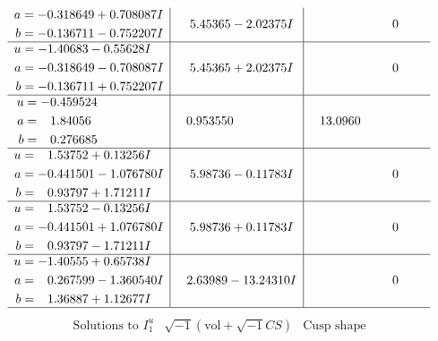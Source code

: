 \documentclass[1p]{elsarticle_modified}
\theoremstyle{definition}
\newcommand{\I}{\sqrt{-1}}
\begin{document}
$$\begin{array}{c|c|c}
\begin{aligned}
a &= -0.318649 + 0.708087 I \\
b &= -0.136711 - 0.752207 I\end{aligned}
 & \phantom{-}5.45365 - 2.02375 I & \phantom{-0.000000 } 0 \\ \hline\begin{aligned}
u &= -1.40683 - 0.55628 I \\
a &= -0.318649 - 0.708087 I \\
b &= -0.136711 + 0.752207 I\end{aligned}
 & \phantom{-}5.45365 + 2.02375 I & \phantom{-0.000000 } 0 \\ \hline\begin{aligned}
u &= -0.459524\phantom{ +0.000000I} \\
a &= \phantom{-}1.84056\phantom{ +0.000000I} \\
b &= \phantom{-}0.276685\phantom{ +0.000000I}\end{aligned}
 & \phantom{-}0.953550\phantom{ +0.000000I} & \phantom{-}13.0960\phantom{ +0.000000I} \\ \hline\begin{aligned}
u &= \phantom{-}1.53752 + 0.13256 I \\
a &= -0.441501 - 1.076780 I \\
b &= \phantom{-}0.93797 + 1.71211 I\end{aligned}
 & \phantom{-}5.98736 - 0.11783 I & \phantom{-0.000000 } 0 \\ \hline\begin{aligned}
u &= \phantom{-}1.53752 - 0.13256 I \\
a &= -0.441501 + 1.076780 I \\
b &= \phantom{-}0.93797 - 1.71211 I\end{aligned}
 & \phantom{-}5.98736 + 0.11783 I & \phantom{-0.000000 } 0 \\ \hline\begin{aligned}
u &= -1.40555 + 0.65738 I \\
a &= \phantom{-}0.267599 - 1.360540 I \\
b &= \phantom{-}1.36887 + 1.12677 I\end{aligned}
 & \phantom{-}2.63989 - 13.24310 I & \phantom{-0.000000 } 0\\
 \hline 
 \end{array}$$\newpage$$\begin{array}{c|c|c}  
\text{Solutions to }I^u_{1}& \I (\text{vol} + \sqrt{-1}CS) & \text{Cusp shape}\\
 \hline 
\begin{aligned}

\end{aligned}
\end{array}$$
\end{document}
